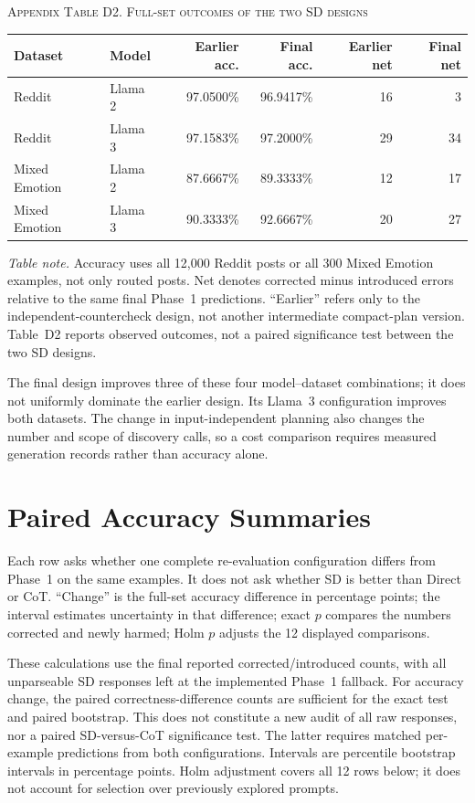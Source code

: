 \documentclass{ieeeaccess}
\begin{document}
\par\medskip\noindent\textsc{Appendix Table D2. Full-set outcomes of the two SD designs}\par\smallskip
{\small\renewcommand{\arraystretch}{1.18}\noindent\begin{tabular*}{\textwidth}{@{\extracolsep{\fill}}llrrrr@{}}\toprule
Dataset & Model & Earlier acc. & Final acc. & Earlier net & Final net \\\midrule
Reddit & Llama 2 & 97.0500\% & 96.9417\% & 16 & 3 \\
Reddit & Llama 3 & 97.1583\% & 97.2000\% & 29 & 34 \\
Mixed Emotion & Llama 2 & 87.6667\% & 89.3333\% & 12 & 17 \\
Mixed Emotion & Llama 3 & 90.3333\% & 92.6667\% & 20 & 27 \\\bottomrule
\end{tabular*}}\par\medskip
\noindent\textit{Table note.} Accuracy uses all 12,000 Reddit posts or all 300 Mixed Emotion examples, not only routed posts. Net denotes corrected minus introduced errors relative to the same final Phase~1 predictions. ``Earlier'' refers only to the independent-countercheck design, not another intermediate compact-plan version. Table~D2 reports observed outcomes, not a paired significance test between the two SD designs.

The final design improves three of these four model--dataset combinations; it does not uniformly dominate the earlier design. Its Llama~3 configuration improves both datasets. The change in input-independent planning also changes the number and scope of discovery calls, so a cost comparison requires measured generation records rather than accuracy alone.

\section{Paired Accuracy Summaries}\label{app:statistics}
Each row asks whether one complete re-evaluation configuration differs from Phase~1 on the same examples. It does not ask whether SD is better than Direct or CoT. ``Change'' is the full-set accuracy difference in percentage points; the interval estimates uncertainty in that difference; exact $p$ compares the numbers corrected and newly harmed; Holm $p$ adjusts the 12 displayed comparisons.

These calculations use the final reported corrected/introduced counts, with all unparseable SD responses left at the implemented Phase~1 fallback. For accuracy change, the paired correctness-difference counts are sufficient for the exact test and paired bootstrap. This does not constitute a new audit of all raw responses, nor a paired SD-versus-CoT significance test. The latter requires matched per-example predictions from both configurations. Intervals are percentile bootstrap intervals in percentage points. Holm adjustment covers all 12 rows below; it does not account for selection over previously explored prompts.
\end{document}
